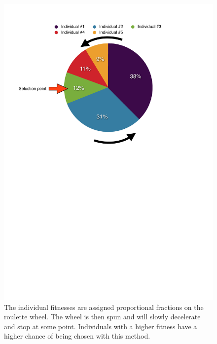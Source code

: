 \begin{figure}[tb] %
   \centering
   \includegraphics[width=\textwidth]{chapter_ga/plots/rws_cropped.pdf} 
   \caption[Roulette Wheel Selection]{The individual fitnesses are assigned proportional fractions on the roulette wheel. The wheel is then spun and will slowly decelerate and stop at some point. Individuals with a higher fitness have a higher chance of being chosen with this method.}
   \label{fig:roulettewheel}
\end{figure}

